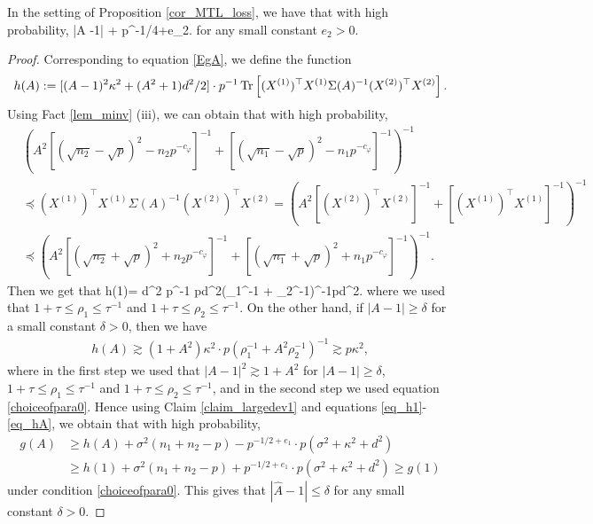 \begin{claim}\label{lem_hat_v}
 In the setting of Proposition \ref{cor_MTL_loss}, we have that with high probability,
	\be\label{hatw_add1}|\hat A -1|\le  {} + p^{-1/4+e_2}. 
	\ee
	for any small constant $e_2>0$.
\end{claim}

\begin{proof}
Corresponding to equation \eqref{EgA}, we define the function
\begin{align*}
h(A):= [(A-1)^2\kappa^2 + (A^2+1)d^2/2] \cdot p^{-1} \operatorname{Tr}\left[ (X^{(1)})^\top X^{(1)} \Sigma(A)^{-1}(X^{(2)})^\top X^{(2)}\right].
\end{align*}
Using Fact \ref{lem_minv} (iii), we can obtain that with high probability,
\begin{align} 
&\left( A^2 \left[(\sqrt{n_2}-\sqrt{p})^{2}-n_2p^{-c_\varphi}\right]^{-1} +\left[(\sqrt{n_1}-\sqrt{p})^{2}-n_1p^{-c_\varphi}\right]^{-1} \right)^{-1} \nonumber\\
&\preceq (X^{(1)})^\top X^{(1)} \Sigma(A)^{-1}(X^{(2)})^\top X^{(2)} =\left( A^2 [(X^{(2)})^\top X^{(2)}]^{-1} + [(X^{(1)})^\top X^{(1)}]^{-1} \right)^{-1} \nonumber\\
&\preceq \left( A^2 \left[(\sqrt{n_2}+\sqrt{p})^{2}+n_2p^{-c_\varphi}\right]^{-1} +\left[(\sqrt{n_1}+\sqrt{p})^{2}+n_1p^{-c_\varphi}\right]^{-1} \right)^{-1}. \label{op_uplow}
\end{align}
Then we get that
\be\label{eq_h1}h(1)= d^2 \cdot p^{-1} \tr{}\lesssim pd^2\left(\rho_1^{-1} + \rho_2^{-1}\right)^{-1}\lesssim pd^2.\ee
where we used that $1+\tau\le \rho_1\le \tau^{-1}$ and $1+\tau\le \rho_2\le \tau^{-1}$. On the other hand, if $|A-1|\ge \delta$ for a small constant $\delta>0$, then we have 
\begin{align}\label{eq_hA}
h(A)\gtrsim (1+A^2)\kappa^2 \cdot p\left(\rho_1^{-1} + A^2 \rho_2^{-1}\right)^{-1} \gtrsim p\kappa^2 ,
\end{align}
where in the first step we used that $|A-1|^2\gtrsim 1+A^2$ for $|A-1|\ge \delta$, $1+\tau\le \rho_1\le \tau^{-1}$ and $1+\tau\le \rho_2\le \tau^{-1}$, and in the second step we used equation \eqref{choiceofpara0}. Hence using Claim \ref{claim_largedev1} and equations \eqref{eq_h1}-\eqref{eq_hA}, we obtain that with high probability,
\begin{align}
g(A)&\ge  h(A) +\sigma^2(n_1+n_2-p) -p^{-1/2+e_1}\cdot p\left(\sigma^2 +\kappa^2+d^2 \right) \nonumber\\
&\ge h(1) +\sigma^2(n_1+n_2-p) + p^{-1/2+e_1}\cdot p\left(\sigma^2 +\kappa^2+d^2 \right) \ge g(1) \label{gA>g1}
\end{align}
under condition \eqref{choiceofpara0}.
This gives that
$|\hat A-1|\le \delta$ for any small constant $\delta>0$.





\end{proof}
